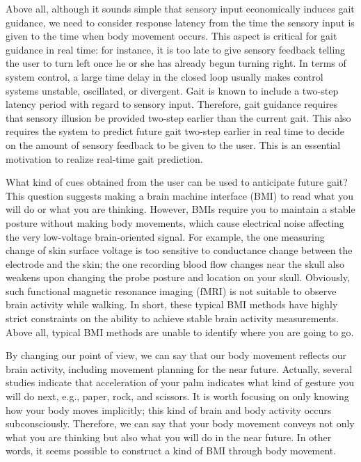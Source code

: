 \documentclass{sigchi}
\begin{document}
Above all, although it sounds simple that sensory input economically induces gait guidance, we need to consider response latency from the time the sensory input is given to the time when body movement occurs. This aspect is critical for gait guidance in real time: for instance, it is too late to give sensory feedback telling the user to turn left once he or she has already begun turning right. In terms of system control, a large time delay in the closed loop usually makes control systems unstable, oscillated, or divergent. Gait is known to include a two-step latency period with regard to sensory input. Therefore, gait guidance requires that sensory illusion be provided two-step earlier than the current gait. This also requires the system to predict future gait two-step earlier in real time to decide on the amount of sensory feedback to be given to the user. This is an essential motivation to realize real-time gait prediction.



What kind of cues obtained from the user can be used to anticipate future gait? This question suggests making a brain machine interface (BMI) to read what you will do or what you are thinking. However, BMIs require you to maintain a stable posture without making body movements, which cause electrical noise affecting the very low-voltage brain-oriented signal\cite{PFURTSCHELLER2006145,OLNEY19859}. For example, the one measuring change of skin surface voltage is too sensitive to conductance change between the electrode and the skin; the one recording blood flow changes near the skull also weakens upon changing the probe posture and location on your skull. Obviously, such functional magnetic resonance imaging (fMRI) is not suitable to observe brain activity while walking. In short, these typical BMI methods have highly strict constraints on the ability to achieve stable brain activity measurements. Above all, typical BMI methods are unable to identify  where you are going to go.

By changing our point of view, we can say that our body movement reflects\cite{VANEMMERIK19961175} our brain activity, including movement planning for the near future\cite{MORRIS1973729,ZIJLSTRA1997249}.%
 Actually, several studies indicate that acceleration of your palm indicates what kind of gesture you will do next, e.g., paper, rock, and scissors. It is worth focusing on only knowing how your body moves implicitly; this kind of brain and body activity occurs subconsciously. Therefore, we can say that your body movement conveys not only what you are thinking but also what you will do in the near future. In other words, it seems possible to construct a kind of BMI through body movement. 
 
\end{document}
